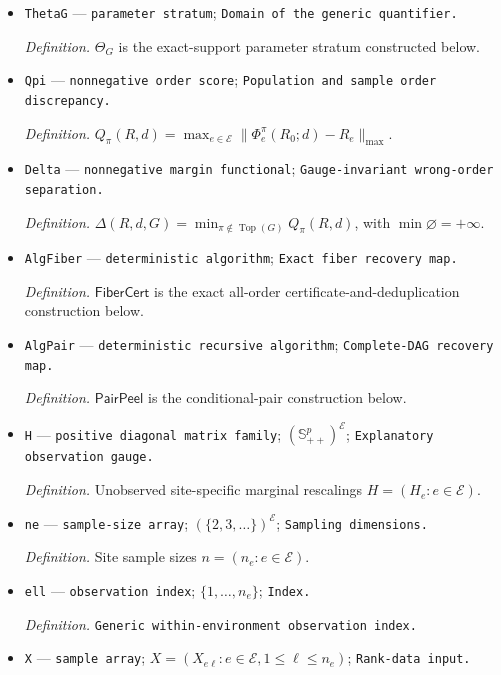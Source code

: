 \documentclass{article}
\begin{document}
\begin{itemize}
  \item \texttt{ThetaG} --- \texttt{parameter stratum}; \texttt{Domain of the generic quantifier.}
  \par\smallskip\noindent\emph{Definition.} \(\Theta_G\) is the exact-support parameter stratum constructed below.
  \item \texttt{Qpi} --- \texttt{nonnegative order score}; \texttt{Population and sample order discrepancy.}
  \par\smallskip\noindent\emph{Definition.} \(Q_{\pi}(R,d)=\max_{e\in\mathcal E}\lVert\Phi_e^{\pi}(R_0;d)-R_e\rVert_{\max}\).
  \item \texttt{Delta} --- \texttt{nonnegative margin functional}; \texttt{Gauge-\allowbreak{}invariant wrong-\allowbreak{}order separation.}
  \par\smallskip\noindent\emph{Definition.} \(\Delta(R,d,G)=\min_{\pi\notin\operatorname{Top}(G)}Q_{\pi}(R,d)\), with \(\min\varnothing=+\infty\).
  \item \texttt{AlgFiber} --- \texttt{deterministic algorithm}; \texttt{Exact fiber recovery map.}
  \par\smallskip\noindent\emph{Definition.} \(\mathsf{FiberCert}\) is the exact all-order certificate-and-deduplication construction below.
  \item \texttt{AlgPair} --- \texttt{deterministic recursive algorithm}; \texttt{Complete-\allowbreak{}DAG recovery map.}
  \par\smallskip\noindent\emph{Definition.} \(\mathsf{PairPeel}\) is the conditional-pair construction below.
  \item \texttt{H} --- \texttt{positive diagonal matrix family}; \((\mathbb S_{++}^{p})^{\mathcal E}\); \texttt{Explanatory observation gauge.}
  \par\smallskip\noindent\emph{Definition.} Unobserved site-specific marginal rescalings \(H=(H_e:e\in\mathcal E)\).
  \item \texttt{ne} --- \texttt{sample-\allowbreak{}size array}; \((\{2,3,\ldots\})^{\mathcal E}\); \texttt{Sampling dimensions.}
  \par\smallskip\noindent\emph{Definition.} Site sample sizes \(n=(n_e:e\in\mathcal E)\).
  \item \texttt{ell} --- \texttt{observation index}; \(\{1,\ldots,n_e\}\); \texttt{Index.}
  \par\smallskip\noindent\emph{Definition.} \texttt{Generic within-\allowbreak{}environment observation index.}
  \item \texttt{X} --- \texttt{sample array}; \(X=(X_{e\ell}:e\in\mathcal E,1\le\ell\le n_e)\); \texttt{Rank-\allowbreak{}data input.}

\end{itemize}
\end{document}
